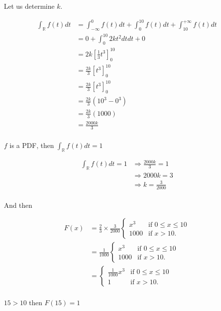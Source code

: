 \documentclass[11pt]{article}
\def\gt{>}
\begin{document}
Let us determine $k$.

\begin{align*}
\int_\mathbb{R} f(t)dt &=\int_\mathbb{-\infty}^0 f(t)dt + \int_0^{10} f(t)dt +\int_{10}^{+\infty} f(t)dt\\
				  &=0+ \int_0^{10} 2kt^2dtdt+0\\
				  &=2k[\frac{1}{3}t^3]_0^{10}\\
				  				  								  &=\frac{2k}{3}[t^3]_0^{10}\\
				  				  								  &=\frac{2k}{3}[t^3]_0^{10}\\
				  				  								  &=\frac{2k}{3}(10^3-0^3)\\
				  				  								  &=\frac{2k}{3}(1000)\\
				  				  								  &=\frac{2000k}{3}\\
\end{align*}

$f$ is a PDF, then $\int_\mathbb{R} f(t)dt=1$

 \begin{align*}
  \int_\mathbb{R} f(t)dt=1 & \Rightarrow \frac{2000k}{3} =1\\ 
 			 &\Rightarrow 2000k=3\\
 			 &\Rightarrow k=\frac{3}{2000}\\  
\end{align*}


And then

\begin{align*}
F(x) &= \frac{2}{3}\times \frac{3}{2000} \begin{cases}
            x^3 & \text{if } 0 \leq x \leq 10 \\
            1000 & \text{if } x \gt 10.
        \end{cases}\\
        &=\frac{1}{1000} \begin{cases}
            x^3 & \text{if } 0 \leq x \leq 10 \\
            1000 & \text{if } x \gt 10.
        \end{cases}\\
         &= \begin{cases}
            \frac{1}{1000}x^3 & \text{if } 0 \leq x \leq 10 \\
            1 & \text{if } x \gt 10.
        \end{cases}\\        
\end{align*}


$15 \gt 10 $ then $F(15)=1$
\end{document}
